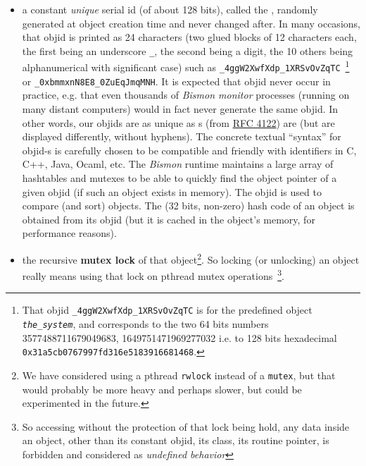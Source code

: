 \begin{itemize}
  \item a constant \emph{unique} serial id (of about 128 bits), called
    the , randomly generated at object
    creation time and never changed after. In many occasions, that
    objid is printed as 24 characters (two glued blocks of 12
    characters each, the first being an underscore \texttt{\_}, the second
    being a digit, the 10 others being alphanumerical with significant
    case) such as \texttt{\_4ggW2XwfXdp\_1XRSvOvZqTC}~\footnote{That
      objid \texttt{\_4ggW2XwfXdp\_1XRSvOvZqTC} is for the predefined
      object \emph{\texttt{the\_system}}, and corresponds to the two
      64 bits numbers 3577488711679049683, 1649751471969277032 i.e. to
      128 bits hexadecimal \texttt{0x31a5cb0767997fd316e5183916681468}.} or
    \texttt{\_0xbmmxnN8E8\_0ZuEqJmqMNH}. It is expected that objid
     never occur in practice, e.g. that
    even thousands of \emph{Bismon monitor} processes (running on many
    distant computers) would in fact never generate the same objid. In
    other words, our objids are as unique as s (from
    \href{https://tools.ietf.org/html/rfc4122}{RFC 4122}) are (but are
    displayed differently, without hyphens). The concrete textual
    ``syntax'' for objid-s is carefully chosen to be compatible and
    friendly with identifiers in C, C++, Java, Ocaml, etc. The
    \emph{Bismon} runtime maintains a large array of hashtables and
    mutexes to be able to quickly find the object pointer of a given
    objid (if such an object exists in memory). The objid is used to
    compare (and sort) objects. The (32 bits, non-zero) hash code of
    an object is obtained from its objid (but it is cached in the
    object's memory, for performance reasons).

    \item the recursive \textbf{mutex lock} of that object\footnote{We
      have considered using a pthread \texttt{rwlock} instead of a
      \texttt{mutex}, but that would probably be more heavy and
      perhaps slower, but could be experimented in the future.}. So
      locking (or unlocking) an object really means using that lock on
      pthread mutex operations~\footnote{So accessing without the
        protection of that lock being hold, any data inside an object,
        other than its constant objid, its class, its routine pointer,
        is forbidden and considered as \emph{undefined behavior}}.


\end{itemize}
